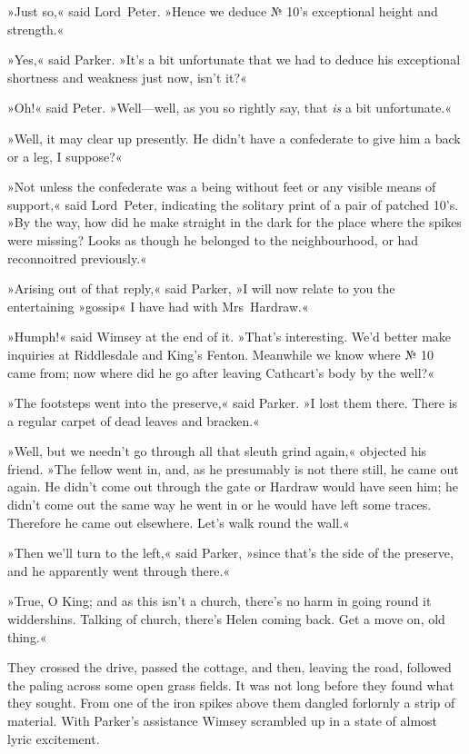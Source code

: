 »Just so,« said Lord~Peter. »Hence we deduce № 10's exceptional height and strength.«

»Yes,« said Parker. »It's a bit unfortunate that we had to deduce his exceptional shortness and weakness just now, isn't it?«

»Oh!« said Peter. »Well—well, as you so rightly say, that \textit{is} a bit unfortunate.«

»Well, it may clear up presently. He didn't have a confederate to give him a back or a leg, I suppose?«

»Not unless the confederate was a being without feet or any visible means of support,« said Lord~Peter, indicating the solitary print of a pair of patched 10's. »By the way, how did he make straight in the dark for the place where the spikes were missing? Looks as though he belonged to the neighbourhood, or had reconnoitred previously.«

»Arising out of that reply,« said Parker, »I will now relate to you the entertaining »gossip« I have had with Mrs~Hardraw.«

»Humph!« said Wimsey at the end of it. »That's interesting. We'd better make inquiries at Riddlesdale and King's Fenton. Meanwhile we know where № 10 came from; now where did he go after leaving Cathcart's body by the well?«

»The footsteps went into the preserve,« said Parker. »I lost them there. There is a regular carpet of dead leaves and bracken.«

»Well, but we needn't go through all that sleuth grind again,« objected his friend. »The fellow went in, and, as he presumably is not there still, he came out again. He didn't come out through the gate or Hardraw would have seen him; he didn't come out the same way he went in or he would have left some traces. Therefore he came out elsewhere.  Let's walk round the wall.«

»Then we'll turn to the left,« said Parker, »since that's the side of the preserve, and he apparently went through there.«

»True, O King; and as this isn't a church, there's no harm in going round it widdershins. Talking of church, there's Helen coming back. Get a move on, old thing.«

They crossed the drive, passed the cottage, and then, leaving the road, followed the paling across some open grass fields. It was not long before they found what they sought. From one of the iron spikes above them dangled forlornly a strip of material. With Parker's assistance Wimsey scrambled up in a state of almost lyric excitement.

